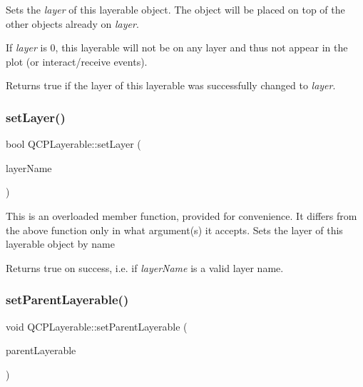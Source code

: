 Sets the {\itshape layer} of this layerable object. The object will be placed on top of the other objects already on {\itshape layer}.

If {\itshape layer} is 0, this layerable will not be on any layer and thus not appear in the plot (or interact/receive events).

Returns true if the layer of this layerable was successfully changed to {\itshape layer}. \mbox{\label{class_q_c_p_layerable_ab25a0e7b897993b44447caee0f142083}} 
\subsubsection{\texorpdfstring{setLayer()}{setLayer()}\hspace{0.1cm}{\footnotesize\ttfamily [2/2]}}
{\footnotesize\ttfamily bool Q\+C\+P\+Layerable\+::set\+Layer (\begin{DoxyParamCaption}\item[{const Q\+String \&}]{layer\+Name }\end{DoxyParamCaption})}

This is an overloaded member function, provided for convenience. It differs from the above function only in what argument(s) it accepts. Sets the layer of this layerable object by name

Returns true on success, i.\+e. if {\itshape layer\+Name} is a valid layer name. \mbox{\label{class_q_c_p_layerable_aa23c893671f1f6744ac235cf2204cf3a}} 
\subsubsection{\texorpdfstring{setParentLayerable()}{setParentLayerable()}}
{\footnotesize\ttfamily void Q\+C\+P\+Layerable\+::set\+Parent\+Layerable (\begin{DoxyParamCaption}\item[{\mbox{\hyperlink{class_q_c_p_layerable}{Q\+C\+P\+Layerable}} $\ast$}]{parent\+Layerable }\end{DoxyParamCaption})\hspace{0.3cm}{\ttfamily [protected]}}

\mbox{\label{class_q_c_p_layerable_a3bed99ddc396b48ce3ebfdc0418744f8}} 
